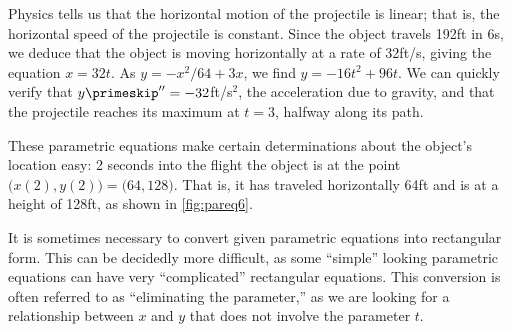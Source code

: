 {Physics tells us that the horizontal motion of the projectile is linear; that is, the horizontal speed of the projectile is constant. Since the object travels 192ft in 6s, we deduce that the object is moving horizontally at a rate of 32ft/s, giving the equation $x=32t$. As $y=-x^2/64+3x$, we find $y= -16t^2+96t$. We can quickly verify that $y\primeskip''=-32$ft/s$^2$, the acceleration due to gravity, and that the projectile reaches its maximum at $t=3$, halfway along its path.

These parametric equations make certain determinations about the object's location easy: 2 seconds into the flight the object is at the point $\big(x(2),y(2)\big) = \big(64,128\big)$. That is, it has traveled horizontally 64ft and is at a height of 128ft, as shown in \autoref{fig:pareq6}.}

It is  sometimes necessary to convert given parametric equations into rectangular form. This can be decidedly more difficult, as some ``simple'' looking parametric equations can have very ``complicated'' rectangular equations. This conversion is often referred to as ``eliminating the parameter,'' as we are looking for a relationship between $x$ and $y$ that does not involve the parameter $t$.

